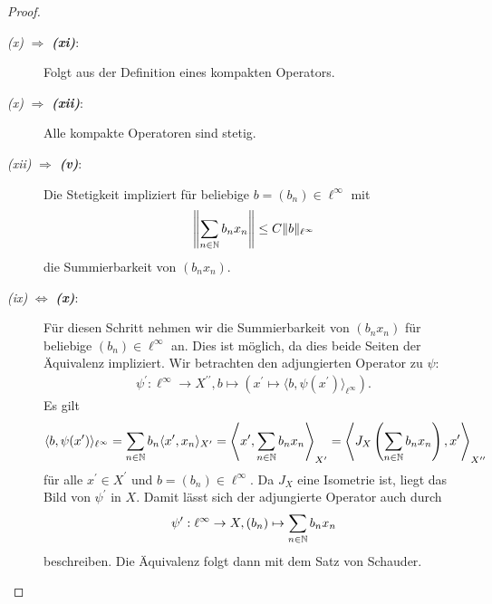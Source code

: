 \begin{proof}
\begin{description}
		\item[\textit{ \itshape\textrm{(x)}} $ \Rightarrow $ \textbf{\textit{\textrm{(xi)}}}:]
		Folgt aus der Definition eines kompakten Operators.
		
		\item[\textit{ \itshape\textrm{(x)}} $ \Rightarrow $ \textbf{\textit{\textrm{(xii)}}}:]
		Alle kompakte Operatoren sind stetig.
		
		\item[\textit{ \itshape\textrm{(xii)}} $ \Rightarrow $ \textbf{\textit{\textrm{(v)}}}:]
		Die Stetigkeit impliziert für beliebige $ b = (b_n) \in \ell^\infty $ mit
		\begin{align*}
			\left\| 
			\sum\limits_{n \in \mathbb{N}} b_n x_n
			\right\|
			\leq C \| b\|_{\ell^\infty}
		\end{align*}
		die Summierbarkeit von $ (b_n x_n) $.
		
		\item[\textit{ \itshape\textrm{(ix)}} $ \Leftrightarrow $ \textbf{\textit{\textrm{(x)}}}:]
		Für diesen Schritt nehmen wir die Summierbarkeit von $ (b_nx_n) $ für beliebige $ (b_n) \in \ell^\infty  $ an.
		Dies ist möglich, da dies beide Seiten der Äquivalenz impliziert.
		Wir betrachten den adjungierten Operator zu $ \psi $:
		\begin{align*}
			\psi^\prime :
			\ell^\infty \to X^{\prime \prime},
			b \mapsto (x^\prime \mapsto \langle b, \psi(x^\prime) \rangle_{\ell^\infty} ).
		\end{align*}
		Es gilt
		\begin{align*}
			\langle b, \psi(x^\prime) \rangle_{\ell^\infty}
			= \sum \limits_{n \in \mathbb{N}} b_n \langle x^\prime , x_n \rangle_{X^\prime}
			=
			\left\langle x^\prime , \sum\limits_{n \in \mathbb{N}} b_n x_n \right\rangle_{X^\prime} 
			=
			\left\langle  J_X \left(\sum\limits_{n \in \mathbb{N}} b_n x_n \right), x^\prime \right\rangle_{X^{\prime \prime }}	
		\end{align*}
		für alle $ x^\prime \in X^\prime  $ und $ b = (b_n) \in \ell^\infty $.
		Da $ J_X$ eine Isometrie ist, liegt das Bild von $ \psi^\prime $ in $ X $.
		Damit lässt sich der adjungierte Operator auch durch
		\begin{align*}
			\psi^\prime :
			\ell^\infty \to X,
			(b_n) \mapsto \sum \limits_{n \in \mathbb{N}} b_n x_n
		\end{align*}
		beschreiben.
		Die Äquivalenz folgt dann mit dem Satz von Schauder.
	\end{description}
\end{proof}

